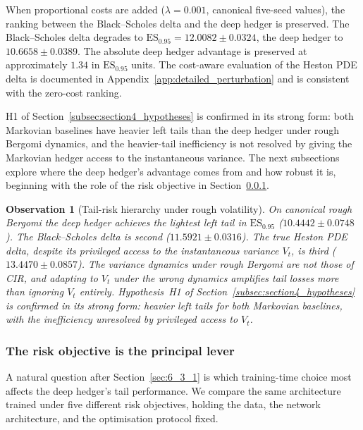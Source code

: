\documentclass[12pt,a4paper]{article}
\theoremstyle{definition}
\theoremstyle{plain}
\theoremstyle{remark}
\theoremstyle{plain}
\newtheorem{observation}{Observation}[section]
\begin{document}
When proportional costs are added ($\lambda = 0.001$, canonical
five-seed values), the ranking between the Black--Scholes delta and the
deep hedger is preserved. The Black--Scholes delta degrades to
$\mathrm{ES}_{0.95} = 12.0082 \pm 0.0324$, the deep hedger to
$10.6658 \pm 0.0389$. The absolute deep hedger advantage is preserved
at approximately $1.34$ in $\mathrm{ES}_{0.95}$ units. The cost-aware
evaluation of the Heston PDE delta is documented in
Appendix~\ref{app:detailed_perturbation} and is consistent with the
zero-cost ranking.

H1 of Section~\ref{subsec:section4_hypotheses} is confirmed in its
strong form: both Markovian baselines have heavier left tails than the
deep hedger under rough Bergomi dynamics, and the heavier-tail
inefficiency is not resolved by giving the Markovian hedger access to
the instantaneous variance. The next subsections explore where the
deep hedger's advantage comes from and how robust it is, beginning
with the role of the risk objective in
Section~\ref{sec:6_3_2}.

\begin{observation}[Tail-risk hierarchy under rough volatility]
\label{obs:6_1_hierarchy}
On canonical rough Bergomi the deep hedger achieves the lightest left
tail in $\mathrm{ES}_{0.95}$ ($10.4442 \pm 0.0748$). The
Black--Scholes delta is second ($11.5921 \pm 0.0316$). The true
Heston PDE delta, despite its privileged access to the instantaneous
variance $V_t$, is third ($13.4470 \pm 0.0857$). The variance
dynamics under rough Bergomi are not those of CIR, and adapting to
$V_t$ under the wrong dynamics amplifies tail losses more than
ignoring $V_t$ entirely. Hypothesis~H1 of
Section~\ref{subsec:section4_hypotheses} is confirmed in its strong
form: heavier left tails for both Markovian baselines, with the
inefficiency unresolved by privileged access to $V_t$.
\end{observation}

\subsubsection{The risk objective is the principal lever}
\label{sec:6_3_2}

A natural question after Section~\ref{sec:6_3_1} is which training-time
choice most affects the deep hedger's tail performance. We compare the
same architecture trained under five different risk objectives, holding
the data, the network architecture, and the optimisation protocol
fixed.
\end{document}
